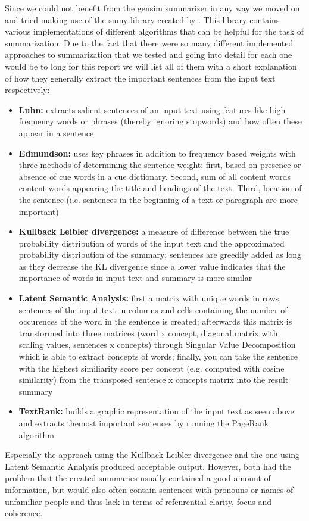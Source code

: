 Since we could not benefit from the gensim summarizer in any way we moved on and tried making use of the sumy library created by \citet{sumy}. This library contains various implementations of different algorithms that can be helpful for the task of summarization. Due to the fact that there were so many different implemented approaches to summarization that we tested and going into detail for each one would be to long for this report we will list all of them with a short explanation of how they generally extract the important sentences from the input text respectively: 
\begin{itemize}
	\item \textbf{Luhn:} extracts salient sentences of an input text using features like high frequency words or phrases (thereby ignoring stopwords) and how often these appear in a sentence
	\item \textbf{Edmundson:} uses key phrases in addition to frequency based weights with three methods of determining the sentence weight: first, based on presence or absence of cue words in a cue dictionary. Second, sum of all content words content words appearing the title and headings of the text. Third, location of the sentence (i.e. sentences in the beginning of a text or paragraph are more important)
	\item \textbf{Kullback Leibler divergence:} a measure of difference between the true probability distribution of words of the input text and the approximated probability distribution of the summary; sentences are greedily added as long as they decrease the KL divergence since a lower value indicates that the importance of words in input text and summary is more similar
	\item \textbf{Latent Semantic Analysis:} first a matrix with unique words in rows, sentences of the input text in columns and cells containing the number of occurences of the word in the sentence is created; afterwards this matrix is transformed into  three matrices (word x concept, diagonal matrix with scaling values, sentences x concepts) through Singular Value Decomposition which is able to extract concepts of words; finally, you can take the sentence with the highest similiarity score per concept (e.g. computed with cosine similarity) from the transposed sentence x concepts matrix into the result summary 
	\item \textbf{TextRank:} builds a graphic representation of the input text as seen above and extracts themost important sentences by running the PageRank algorithm	
\end{itemize} 
Especially the approach using the Kullback Leibler divergence and the one using Latent Semantic Analysis produced acceptable output. However, both had the problem that the created summaries usually contained a good amount of information, but would also often contain sentences with pronouns or names of unfamiliar people and thus lack in terms of refenrential clarity, focus and coherence. 

